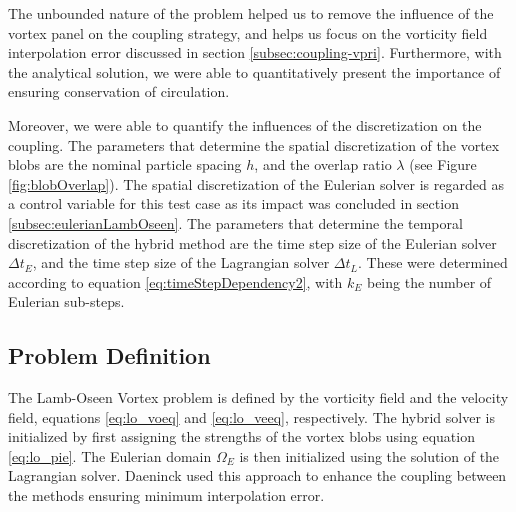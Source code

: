 The unbounded nature of the problem helped us to remove the influence of the vortex panel on the coupling strategy, and helps us focus on the vorticity field interpolation error discussed in section \ref{subsec:coupling-vpri}. Furthermore, with the analytical solution, we were able to quantitatively present the importance of ensuring conservation of circulation. 


Moreover, we were able to quantify the influences of the discretization on the coupling. The parameters that determine the spatial discretization of the vortex blobs are the nominal particle spacing $h$, and the overlap ratio $\lambda$ (see Figure \ref{fig:blobOverlap}). The spatial discretization of the Eulerian solver is regarded as a control variable for this test case as its impact was concluded in section \ref{subsec:eulerianLambOseen}. The parameters that determine the temporal discretization of the hybrid method are the time step size of the Eulerian solver $\Delta t_E$, and the time step size of the Lagrangian solver $\Delta t_L$. These were determined according to equation \ref{eq:timeStepDependency2}, with  $k_E$ being the number of Eulerian sub-steps.



\subsection{Problem Definition}

The Lamb-Oseen Vortex problem is defined by the vorticity field and the velocity field, equations \ref{eq:lo_voeq} and \ref{eq:lo_veeq}, respectively. The hybrid solver is initialized by first assigning the strengths of the vortex blobs using equation \ref{eq:lo_pie}. The Eulerian domain $\Omega_E$ is then initialized using the solution of the Lagrangian solver. Daeninck \cite{Daeninck2006} used this approach to enhance the coupling between the methods ensuring minimum interpolation error.

